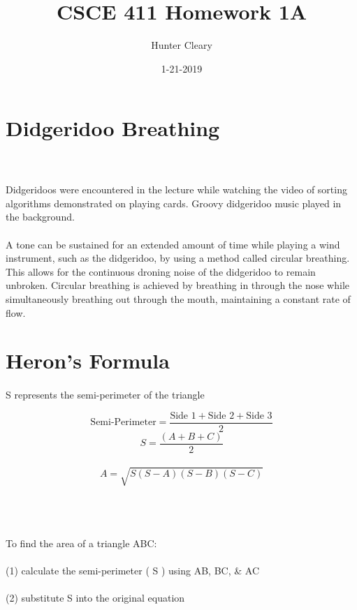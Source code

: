 \documentclass{article}
\title{CSCE 411 Homework 1A}
\author{Hunter Cleary }
\date{1-21-2019}
\begin{document}
\maketitle

\section{Didgeridoo Breathing}
\paragraph{}
\begin{large}
\\ \\
Didgeridoos were encountered in the lecture while watching the video of sorting algorithms demonstrated on playing cards. Groovy didgeridoo music played in the background. 
\\ \\
\indent A tone can be sustained for an extended amount of time while playing a wind instrument, such as the didgeridoo,  by using a method called circular breathing. This allows for the continuous droning noise of the didgeridoo to remain unbroken. Circular breathing is achieved by breathing in through the nose while simultaneously breathing out through the mouth, maintaining a constant rate of flow. 
\end{large}

\section{Heron's Formula}
\paragraph{}
\begin{center}
\begin{large}
S represents the semi-perimeter of the triangle
\end{large}
\end{center} 
\[ \text{Semi-Perimeter} = \frac{ \text{Side 1} + \text{Side 2} + \text{Side 3} }{2} \]
\[ S = \frac{(A+B+C)}{2} \]
\\ 
\[ A = \sqrt{S(S-A)(S-B)(S-C)} \]
\\

\begin{large}
\\ \\ 
To find the area of a triangle ABC: \\ \\ 
(1) calculate the semi-perimeter ( S ) using AB, BC, & AC \\ \\
(2) substitute S into the original equation
\end{large}
\end{document}
